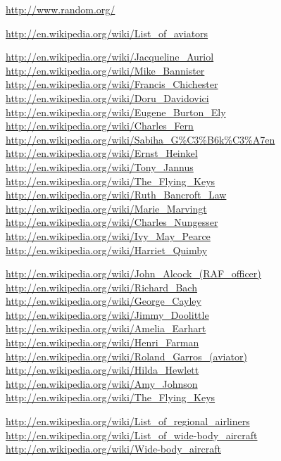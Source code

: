 \url{http://www.random.org/}

\url{http://en.wikipedia.org/wiki/List_of_aviators}

\url{http://en.wikipedia.org/wiki/Jacqueline_Auriol}\\
\url{http://en.wikipedia.org/wiki/Mike_Bannister}\\
\url{http://en.wikipedia.org/wiki/Francis_Chichester}\\
\url{http://en.wikipedia.org/wiki/Doru_Davidovici}\\
\url{http://en.wikipedia.org/wiki/Eugene_Burton_Ely}\\
\url{http://en.wikipedia.org/wiki/Charles_Fern}\\
\url{http://en.wikipedia.org/wiki/Sabiha_G\%C3\%B6k\%C3\%A7en}\\
\url{http://en.wikipedia.org/wiki/Ernst_Heinkel}\\
\url{http://en.wikipedia.org/wiki/Tony_Jannus}\\
\url{http://en.wikipedia.org/wiki/The_Flying_Keys}\\
\url{http://en.wikipedia.org/wiki/Ruth_Bancroft_Law}\\
\url{http://en.wikipedia.org/wiki/Marie_Marvingt}\\
\url{http://en.wikipedia.org/wiki/Charles_Nungesser}\\
\url{http://en.wikipedia.org/wiki/Ivy_May_Pearce}\\
\url{http://en.wikipedia.org/wiki/Harriet_Quimby}

\url{http://en.wikipedia.org/wiki/John_Alcock_(RAF_officer)}\\
\url{http://en.wikipedia.org/wiki/Richard_Bach}\\
\url{http://en.wikipedia.org/wiki/George_Cayley}\\
\url{http://en.wikipedia.org/wiki/Jimmy_Doolittle}\\
\url{http://en.wikipedia.org/wiki/Amelia_Earhart}\\
\url{http://en.wikipedia.org/wiki/Henri_Farman}\\
\url{http://en.wikipedia.org/wiki/Roland_Garros_(aviator)}\\
\url{http://en.wikipedia.org/wiki/Hilda_Hewlett}\\
\url{http://en.wikipedia.org/wiki/Amy_Johnson}\\
\url{http://en.wikipedia.org/wiki/The_Flying_Keys}

\url{http://en.wikipedia.org/wiki/List_of_regional_airliners}\\
\url{http://en.wikipedia.org/wiki/List_of_wide-body_aircraft}\\
\url{http://en.wikipedia.org/wiki/Wide-body_aircraft}\\

